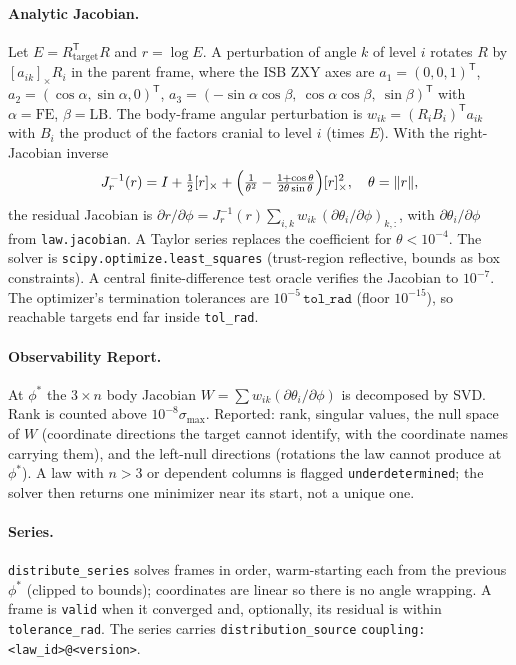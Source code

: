 \paragraph{Analytic Jacobian.}
Let $E=R_{\mathrm{target}}^{\mathsf T}R$ and $r=\log E$. A perturbation of angle
$k$ of level $i$ rotates $R$ by $[a_{ik}]_\times R_i$ in the parent frame, where
the ISB ZXY axes are
$a_{1}=(0,0,1)^{\mathsf T}$,
$a_{2}=(\cos\alpha,\sin\alpha,0)^{\mathsf T}$,
$a_{3}=(-\sin\alpha\cos\beta,\ \cos\alpha\cos\beta,\ \sin\beta)^{\mathsf T}$
with $\alpha=\mathrm{FE}$, $\beta=\mathrm{LB}$. The body-frame angular
perturbation is $w_{ik}=(R_iB_i)^{\mathsf T}a_{ik}$ with $B_i$ the product of the
factors cranial to level $i$ (times $E$). With the right-Jacobian inverse
\begin{equation}
  J_r^{-1}(r)=I+\tfrac12[r]_\times+\Bigl(\tfrac1{\theta^2}-\tfrac{1+\cos\theta}{2\theta\sin\theta}\Bigr)[r]_\times^{2},\quad\theta=\lVert r\rVert,
\end{equation}
the residual Jacobian is $\partial r/\partial\phi=J_r^{-1}(r)\sum_{i,k}w_{ik}\,(\partial\theta_i/\partial\phi)_{k,:}$,
with $\partial\theta_i/\partial\phi$ from \texttt{law.jacobian}. A Taylor series
replaces the coefficient for $\theta<10^{-4}$. The solver is
\texttt{scipy.optimize.least\_squares} (trust-region reflective, bounds as box
constraints). A central finite-difference test oracle verifies the Jacobian to
$10^{-7}$. The optimizer's termination tolerances are $10^{-5}\,\texttt{tol\_rad}$
(floor $10^{-15}$), so reachable targets end far inside \texttt{tol\_rad}.

\paragraph{Observability Report.}
At $\phi^{*}$ the $3\times n$ body Jacobian $W=\sum w_{ik}(\partial\theta_i/\partial\phi)$
is decomposed by SVD. Rank is counted above $10^{-8}\sigma_{\max}$. Reported:
rank, singular values, the null space of $W$ (coordinate directions the target
cannot identify, with the coordinate names carrying them), and the left-null
directions (rotations the law cannot produce at $\phi^{*}$). A law with $n>3$
or dependent columns is flagged \texttt{underdetermined}; the solver then
returns one minimizer near its start, not a unique one.

\paragraph{Series.}
\texttt{distribute\_series} solves frames in order, warm-starting each from the
previous $\phi^{*}$ (clipped to bounds); coordinates are linear so there is no
angle wrapping. A frame is \texttt{valid} when it converged and, optionally,
its residual is within \texttt{tolerance\_rad}. The series carries
\texttt{distribution\_source} \texttt{coupling:<law\_id>@<version>}.

